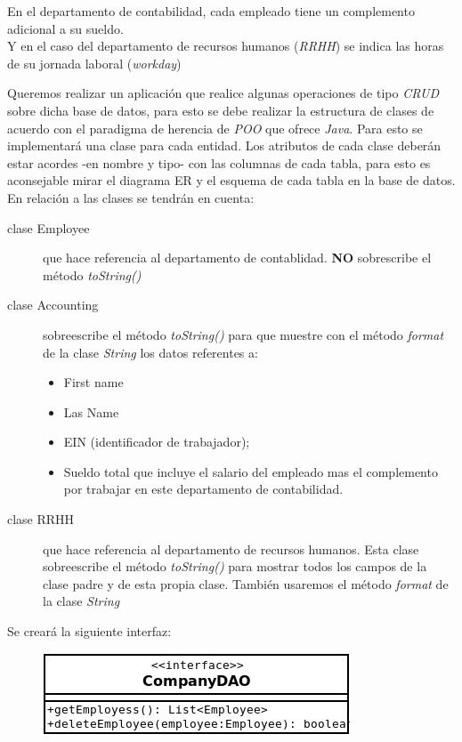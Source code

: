 \documentclass[addpoints,12pt]{exam}
\begin{document}
En el departamento de contabilidad, cada empleado tiene un complemento adicional a su sueldo.\\
Y en el caso del departamento de recursos humanos (\emph{RRHH}) se indica las horas de su jornada laboral (\emph{workday})
\newpage
\begin{questions}
\question Queremos realizar un aplicación que realice algunas operaciones de tipo \emph{CRUD} sobre dicha base de datos, para esto se debe realizar la estructura de clases de acuerdo con el paradigma de herencia de \emph{POO} que ofrece \emph{Java}. Para esto se implementará una clase para cada entidad. Los atributos de cada clase deberán estar acordes -en nombre y tipo- con las columnas de cada tabla, para esto es aconsejable mirar el diagrama ER y el esquema de cada tabla en la base de datos. En relación a las clases se tendrán en cuenta:
\begin{description}
\item[clase Employee] que hace referencia al departamento de contablidad. {\small \textbf{NO}} sobrescribe el método \emph{toString()}
\item[clase Accounting] sobreescribe el método \emph{toString()} para que muestre con el método \emph{format} de la clase \emph{String} los datos referentes a:
\begin{itemize}
\item First name
\item Las Name
\item EIN (identificador de trabajador);
\item Sueldo total que incluye el salario del empleado mas el complemento por trabajar en este departamento de contabilidad.
\end{itemize}
\item[clase RRHH] que hace referencia al departamento de recursos humanos. Esta clase sobreescribe el método \emph{toString()} para mostrar todos los campos de la clase padre y de esta propia clase. También usaremos el método \emph{format} de la clase \emph{String}
\end{description}
Se creará la siguiente interfaz:
\begin{figure}[h]
\begin{center}
\includegraphics[scale=0.7]{dao1.png}

\end{center}
\end{figure}
\end{questions}
\end{document}
